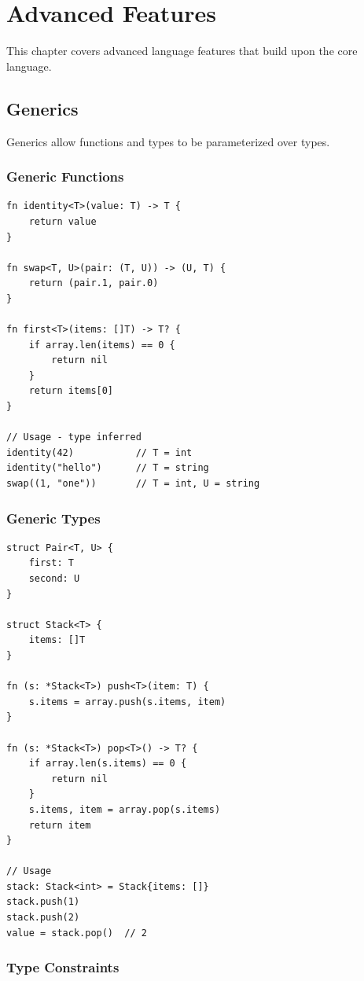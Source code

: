 \chapter{Advanced Features}
\label{ch:advanced}

This chapter covers advanced language features that build upon the core language.

\section{Generics}

Generics allow functions and types to be parameterized over types.

\subsection{Generic Functions}

\begin{lstlisting}
fn identity<T>(value: T) -> T {
    return value
}

fn swap<T, U>(pair: (T, U)) -> (U, T) {
    return (pair.1, pair.0)
}

fn first<T>(items: []T) -> T? {
    if array.len(items) == 0 {
        return nil
    }
    return items[0]
}

// Usage - type inferred
identity(42)           // T = int
identity("hello")      // T = string
swap((1, "one"))       // T = int, U = string
\end{lstlisting}

\subsection{Generic Types}

\begin{lstlisting}
struct Pair<T, U> {
    first: T
    second: U
}

struct Stack<T> {
    items: []T
}

fn (s: *Stack<T>) push<T>(item: T) {
    s.items = array.push(s.items, item)
}

fn (s: *Stack<T>) pop<T>() -> T? {
    if array.len(s.items) == 0 {
        return nil
    }
    s.items, item = array.pop(s.items)
    return item
}

// Usage
stack: Stack<int> = Stack{items: []}
stack.push(1)
stack.push(2)
value = stack.pop()  // 2
\end{lstlisting}

\subsection{Type Constraints}

